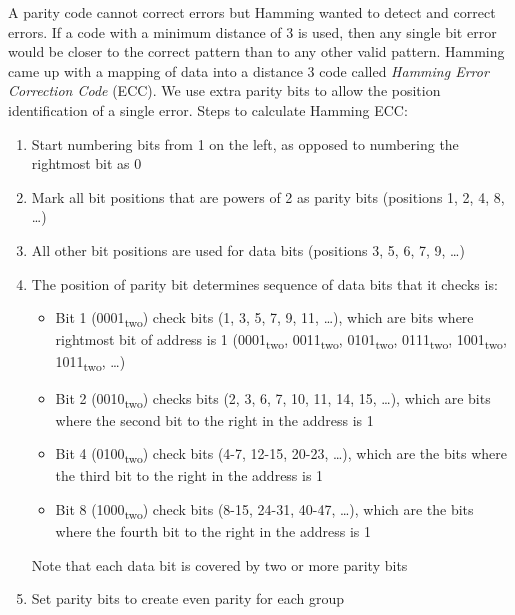\documentclass[12pt]{article}
\theoremstyle{definition}
\begin{document}
  A parity code cannot correct errors but Hamming wanted to detect and correct errors.
  If a code with a minimum distance of 3 is used, then any single bit error would be closer to the correct pattern than to any other valid pattern.
  Hamming came up with a mapping of data into a distance 3 code called \emph{Hamming Error Correction Code} (ECC).
  We use extra parity bits to allow the position identification of a single error.
  Steps to calculate Hamming ECC:
  \begin{enumerate}
    \item Start numbering bits from 1 on the left, as opposed to numbering the rightmost bit as 0
    \item Mark all bit positions that are powers of 2 as parity bits (positions 1, 2, 4, 8, \dots)
    \item All other bit positions are used for data bits (positions 3, 5, 6, 7, 9, \dots)
    \item The position of parity bit determines sequence of data bits that it checks is:
    \begin{itemize}
      \item Bit 1 (0001\textsubscript{two}) check bits (1, 3, 5, 7, 9, 11, \dots), which are bits where rightmost bit of address is 1
      (0001\textsubscript{two}, 0011\textsubscript{two}, 0101\textsubscript{two},
      0111\textsubscript{two}, 1001\textsubscript{two}, 1011\textsubscript{two}, \dots)
      \item Bit 2 (0010\textsubscript{two}) checks bits (2, 3, 6, 7, 10, 11, 14, 15, \dots), which are bits where the second bit to the right in the address is 1
      \item Bit 4 (0100\textsubscript{two}) check bits (4-7, 12-15, 20-23, \dots), which are the bits where the third bit to the right in the address is 1
      \item Bit 8 (1000\textsubscript{two}) check bits (8-15, 24-31, 40-47, \dots), which are the bits where the fourth bit to the right in the address is 1
    \end{itemize}
    Note that each data bit is covered by two or more parity bits
    \item Set parity bits to create even parity for each group
  \end{enumerate}
\end{document}
